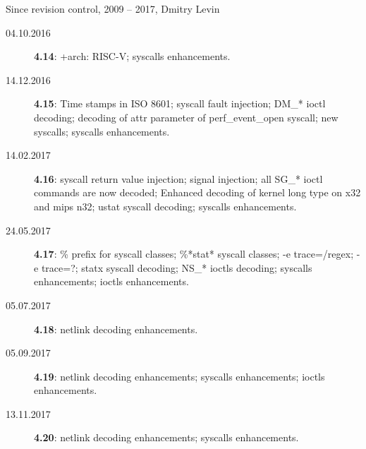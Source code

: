 \documentclass[unicode,aspectratio=169]{beamer}
\begin{document}
\begin{frame}{Since revision control, 2009 -- 2017, Dmitry Levin}
	\begin{description}
		\item[04.10.2016] {\bf 4.14}:
			+arch: RISC-V;
			syscalls enhancements.
		\item[14.12.2016] {\bf 4.15}:
			Time stamps in ISO 8601;
			syscall fault injection;
			DM\_* ioctl decoding;
			decoding of attr parameter of perf\_event\_open syscall;
			new syscalls;
			syscalls enhancements.
		\item[14.02.2017] {\bf 4.16}:
			syscall return value injection;
			signal injection;
			all SG\_* ioctl commands are now decoded;
			Enhanced decoding of kernel long type on x32 and mips n32;
			ustat syscall decoding;
			syscalls enhancements.
		\item[24.05.2017] {\bf 4.17}:
			\% prefix for syscall classes;
			\%*stat* syscall classes;
			-e trace=/regex;
			-e trace=?;
			statx syscall decoding;
			NS\_* ioctls decoding;
			syscalls enhancements;
			ioctls enhancements.
		\item[05.07.2017] {\bf 4.18}:
			netlink decoding enhancements.
		\item[05.09.2017] {\bf 4.19}:
			netlink decoding enhancements;
			syscalls enhancements;
			ioctls enhancements.
		\item[13.11.2017] {\bf 4.20}:
			netlink decoding enhancements;
			syscalls enhancements.
	\end{description}
\end{frame}

\end{document}
